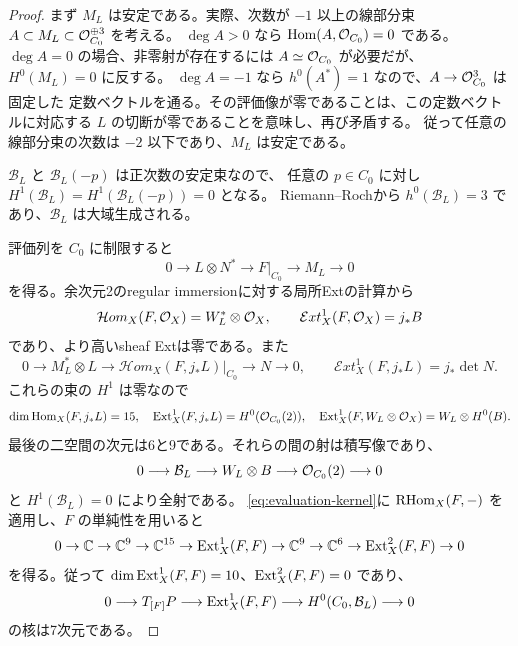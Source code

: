 \begin{proof}
まず $M_L$ は安定である。実際、次数が $-1$ 以上の線部分束
$A\subset M_L\subset\mathcal O_{C_0}^{\oplus3}$ を考える。
$\deg A>0$ なら $\operatorname{Hom}(A,\mathcal O_{C_0})=0$ である。
$\deg A=0$ の場合、非零射が存在するには $A\simeq\mathcal O_{C_0}$ が必要だが、
$H^0(M_L)=0$ に反する。
$\deg A=-1$ なら $h^0(A^*)=1$ なので、$A\to\mathcal O_{C_0}^3$ は固定した
定数ベクトルを通る。その評価像が零であることは、この定数ベクトルに対応する
$L$ の切断が零であることを意味し、再び矛盾する。
従って任意の線部分束の次数は $-2$ 以下であり、$M_L$ は安定である。

$\mathcal B_L$ と $\mathcal B_L(-p)$ は正次数の安定束なので、
任意の $p\in C_0$ に対し $H^1(\mathcal B_L)=H^1(\mathcal B_L(-p))=0$ となる。
Riemann--Rochから $h^0(\mathcal B_L)=3$ であり、$\mathcal B_L$ は大域生成される。

評価列を $C_0$ に制限すると
\begin{equation}\label{eq:evaluation-restriction}
 0\longrightarrow L\otimes N^*\longrightarrow F|_{C_0}
   \longrightarrow M_L\longrightarrow0
\end{equation}
を得る。余次元2のregular immersionに対する局所Extの計算から
\[
 \mathcal Hom_X(F,\mathcal O_X)=W_L^*\otimes\mathcal O_X,
 \qquad \mathcal Ext^1_X(F,\mathcal O_X)=j_*B
\]
であり、より高いsheaf Extは零である。また
\[
 0\longrightarrow M_L^*\otimes L\longrightarrow
 \mathcal Hom_X(F,j_*L)|_{C_0}\longrightarrow N\longrightarrow0,
 \qquad
 \mathcal Ext^1_X(F,j_*L)=j_*\det N.
\]
これらの束の $H^1$ は零なので
\[
 \dim\operatorname{Hom}_X(F,j_*L)=15,\quad
 \operatorname{Ext}^1_X(F,j_*L)=H^0(\mathcal O_{C_0}(2)),\quad
 \operatorname{Ext}^1_X(F,W_L\otimes\mathcal O_X)=W_L\otimes H^0(B).
\]
最後の二空間の次元は6と9である。それらの間の射は積写像であり、
\[
 0\longrightarrow\mathcal B_L\longrightarrow W_L\otimes B
   \longrightarrow\mathcal O_{C_0}(2)\longrightarrow0
\]
と $H^1(\mathcal B_L)=0$ により全射である。
\eqref{eq:evaluation-kernel}に $\operatorname{RHom}_X(F,-)$ を適用し、$F$ の単純性を用いると
\[
 0\to\mathbb C\to\mathbb C^9\to\mathbb C^{15}\to\operatorname{Ext}^1_X(F,F)
 \to\mathbb C^9\to\mathbb C^6\to\operatorname{Ext}^2_X(F,F)\to0
\]
を得る。従って $\dim\operatorname{Ext}^1_X(F,F)=10$、$\operatorname{Ext}^2_X(F,F)=0$ であり、
\begin{equation}\label{eq:normal-evaluation-sequence}
 0\longrightarrow T_{[F]}P\longrightarrow\operatorname{Ext}^1_X(F,F)
 \longrightarrow H^0(C_0,\mathcal B_L)\longrightarrow0
\end{equation}
の核は7次元である。


\end{proof}
